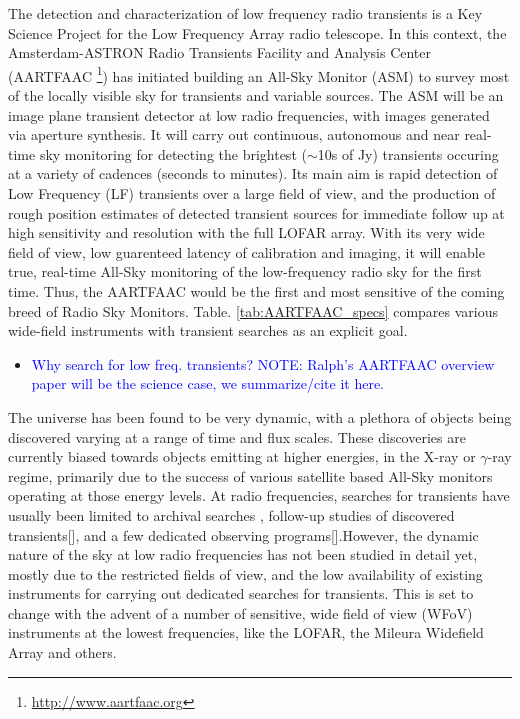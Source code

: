 \documentclass{aa}
\begin{document}
The detection and characterization of low frequency radio transients is
a Key Science Project \cite{fender2006lofar} for the Low Frequency Array
\citep[LOFAR;][]{vanhaarlem2013lofar} radio telescope. In this context,
the Amsterdam-ASTRON Radio Transients Facility and Analysis Center
(AARTFAAC \footnote{\url{http://www.aartfaac.org}}) has initiated
building an All-Sky Monitor (ASM) to survey most of the locally visible
sky for transients and variable sources. The ASM will be an image plane
transient detector at low radio frequencies, with images generated via
aperture synthesis. It will carry out continuous, autonomous and near
real-time sky monitoring for detecting the brightest ($\sim$10s of Jy)
transients occuring at a variety of cadences (seconds to minutes). Its
main aim is rapid detection of Low Frequency (LF) transients over a
large field of view, and the production of rough position estimates of
detected transient sources for immediate follow up at high sensitivity
and resolution with the full LOFAR array. With its very wide field of
view, low guarenteed latency of calibration and imaging, it will enable
true, real-time All-Sky monitoring of the low-frequency radio sky for
the first time. Thus, the AARTFAAC would be the first and most sensitive
of the coming breed of Radio Sky Monitors. Table.
\ref{tab:AARTFAAC_specs} compares various wide-field instruments with
transient searches as an explicit goal.

\begin{itemize}
\item \textcolor{blue}{Why search for low freq. transients? NOTE: Ralph's
AARTFAAC overview paper will be the science case, we summarize/cite
it here.}
\end{itemize}

The universe has been found to be very dynamic, with a plethora of
objects being discovered varying at a range of time and flux scales.
These discoveries are currently biased towards objects emitting at
higher energies, in the X-ray or $\gamma$-ray regime, primarily due
to the success of various satellite based All-Sky monitors operating
at those energy levels. At radio frequencies, searches for transients
have usually been limited to archival searches \citep{bower2007submillijansky,bower2011search},
follow-up studies of discovered transients{[}{]}, and a few dedicated
observing programs{[}{]}.However, the dynamic nature of the sky at
low radio frequencies has not been studied in detail yet, mostly due
to the restricted fields of view, and the low availability of existing
instruments for carrying out dedicated searches for transients. This
is set to change with the advent of a number of sensitive, wide field
of view (WFoV) instruments at the lowest frequencies, like the LOFAR,
the Mileura Widefield Array \citep[MWA;][]{lonsdale2009murchison} and
others.
\end{document}
